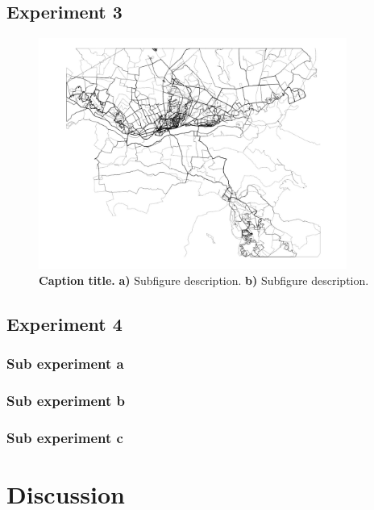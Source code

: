 \documentclass[onecolumn, 11pt,openany]{memoir}
\begin{document}
\begin{multicols}{2}
\subsection{Experiment 3}
\lipsum[10]

\begin{figure}[hb]
\centering
\includegraphics[width=0.9\textwidth]{Figures/Fig2}
\caption{\textbf{Caption title.} \textbf{a)} Subfigure description. \textbf{b)} Subfigure description.}
\label{fig2}
\end{figure}

\subsection{Experiment 4}
\lipsum[1]

\subsubsection{Sub experiment a}
\lipsum[1]

\subsubsection{Sub experiment b}
\lipsum[1]

\subsubsection{Sub experiment c}
\lipsum[1]

\section{Discussion}
\lipsum[1-6]


\end{multicols}
\end{document}
